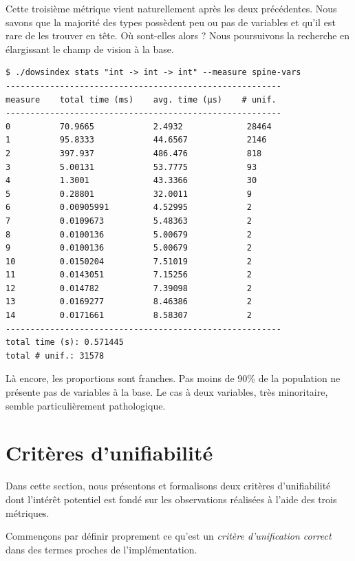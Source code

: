 \documentclass[a4paper]{report}
\theoremstyle{definition}
\begin{document}
Cette troisième métrique vient naturellement après les deux précédentes. Nous savons que la majorité des types possèdent peu ou pas de variables et qu'il est rare de les trouver en tête. Où sont-elles alors ? Nous poursuivons la recherche en élargissant le champ de vision à la base.

\begin{verbatim}
$ ./dowsindex stats "int -> int -> int" --measure spine-vars
--------------------------------------------------------
measure    total time (ms)    avg. time (µs)    # unif.
--------------------------------------------------------
0          70.9665            2.4932             28464
1          95.8333            44.6567            2146
2          397.937            486.476            818
3          5.00131            53.7775            93
4          1.3001             43.3366            30
5          0.28801            32.0011            9
6          0.00905991         4.52995            2
7          0.0109673          5.48363            2
8          0.0100136          5.00679            2
9          0.0100136          5.00679            2
10         0.0150204          7.51019            2
11         0.0143051          7.15256            2
12         0.014782           7.39098            2
13         0.0169277          8.46386            2
14         0.0171661          8.58307            2
--------------------------------------------------------
total time (s): 0.571445
total # unif.: 31578
\end{verbatim}

Là encore, les proportions sont franches. Pas moins de 90\% de la population ne présente pas de variables à la base. Le cas à deux variables, très minoritaire, semble particulièrement pathologique.


\section{Critères d'unifiabilité}

Dans cette section, nous présentons et formalisons deux critères d'unifiabilité dont l'intérêt potentiel est fondé sur les observations réalisées à l'aide des trois métriques.

Commençons par définir proprement ce qu'est un \emph{critère d'unification correct} dans des termes proches de l'implémentation.
\end{document}
